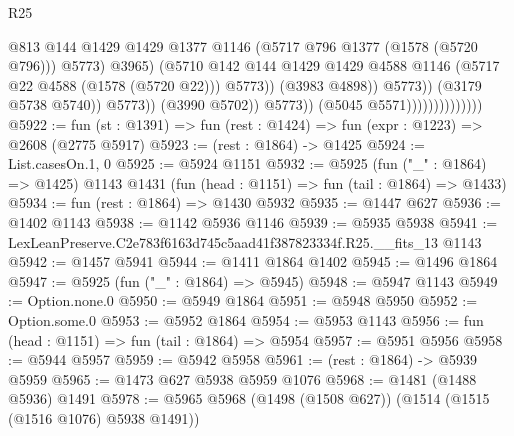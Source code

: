 \begin{lexlean}{R25}
\begin{coremodule}
                                                      @813
                                                      @144
                                                      @1429
                                                      @1429
                                                      @1377
                                                      @1146
                                                      (@5717 @796 @1377 (@1578 (@5720 @796)))
                                                      @5773)
                                                    @3965)
                                                  (@5710
                                                    @142
                                                    @144
                                                    @1429
                                                    @1429
                                                    @4588
                                                    @1146
                                                    (@5717 @22 @4588 (@1578 (@5720 @22)))
                                                    @5773))
                                                (@3983 @4898))
                                              @5773))
                                          (@3179 @5738 @5740))
                                        @5773))
                                    (@3990 @5702))
                                  @5773))
                              (@5045 @5571))))))))))))))
@5922 := fun (st : @1391) => fun (rest : @1424) => fun (expr : @1223) => @2608 (@2775 @5917)
@5923 := (rest : @1864) -> @1425
@5924 := List.casesOn.{1, 0}
@5925 := @5924 @1151
@5932 := @5925
    (fun ("_" : @1864) => @1425)
    @1143
    @1431
    (fun (head : @1151) => fun (tail : @1864) => @1433)
@5934 := fun (rest : @1864) => @1430 @5932
@5935 := @1447 @627
@5936 := @1402 @1143
@5938 := @1142 @5936 @1146
@5939 := @5935 @5938
@5941 := LexLeanPreserve.C2e783f6163d745c5aad41f387823334f.R25.__fits_13 @1143
@5942 := @1457 @5941
@5944 := @1411 @1864 @1402
@5945 := @1496 @1864
@5947 := @5925 (fun ("_" : @1864) => @5945)
@5948 := @5947 @1143
@5949 := Option.none.{0}
@5950 := @5949 @1864
@5951 := @5948 @5950
@5952 := Option.some.{0}
@5953 := @5952 @1864
@5954 := @5953 @1143
@5956 := fun (head : @1151) => fun (tail : @1864) => @5954
@5957 := @5951 @5956
@5958 := @5944 @5957
@5959 := @5942 @5958
@5961 := (rest : @1864) -> @5939 @5959
@5965 := @1473 @627 @5938 @5959 @1076
@5968 := @1481 (@1488 @5936) @1491
@5978 := @5965 @5968 (@1498 (@1508 @627)) (@1514 (@1515 (@1516 @1076) @5938 @1491))

\end{coremodule}
\end{lexlean}
